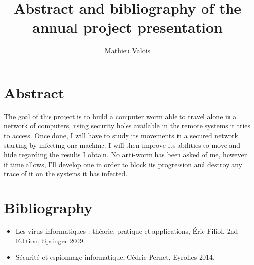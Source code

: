 \documentclass[10pt,a4paper]{article}
\author{Mathieu Valois}
\title{Abstract and bibliography of the annual project presentation}
\begin{document}
\maketitle
\section{Abstract}
The goal of this project is to build a computer worm able to travel alone in a network of computers, using security holes available in the remote systems it tries to access.
Once done, I will have to study its movements in a secured network starting by infecting one machine. I will then improve its abilities to move and hide regarding the results I obtain. 
No anti-worm has been asked of me, however if time allows, I'll develop one in order to block its progression and destroy any trace of it on the systems it has infected.
\section{Bibliography}
\begin{itemize}
\item Les virus informatiques : théorie, pratique et applications, Éric Filiol, 2nd Edition, Springer 2009.
\item Sécurité et espionnage informatique, Cédric Pernet, Eyrolles 2014.
\end{itemize}
\end{document}
